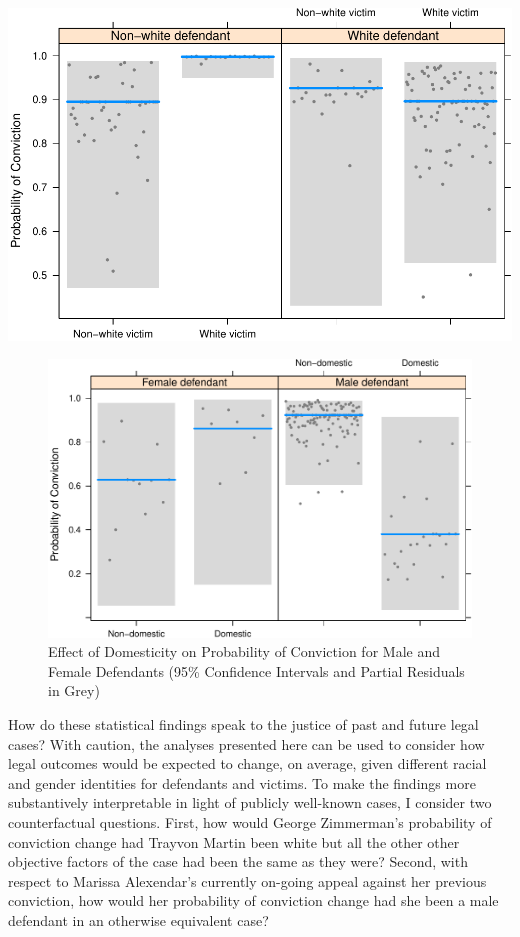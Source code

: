 \documentclass[12pt,article]{article}
\begin{document}
\pagebreak
\includegraphics{stand_your_ground_article_files/figure-latex/unnamed-chunk-4.pdf}

\pagebreak

\begin{figure}[htbp]
\centering
\includegraphics{stand_your_ground_article_files/figure-latex/unnamed-chunk-5.pdf}
\caption{Effect of Domesticity on Probability of Conviction for Male and
Female Defendants (95\% Confidence Intervals and Partial Residuals in
Grey)}
\end{figure}

How do these statistical findings speak to the justice of past and
future legal cases? With caution, the analyses presented here can be
used to consider how legal outcomes would be expected to change, on
average, given different racial and gender identities for defendants and
victims. To make the findings more substantively interpretable in light
of publicly well-known cases, I consider two counterfactual questions.
First, how would George Zimmerman's probability of conviction change had
Trayvon Martin been white but all the other other objective factors of
the case had been the same as they were? Second, with respect to Marissa
Alexendar's currently on-going appeal against her previous conviction,
how would her probability of conviction change had she been a male
defendant in an otherwise equivalent case?
\end{document}
